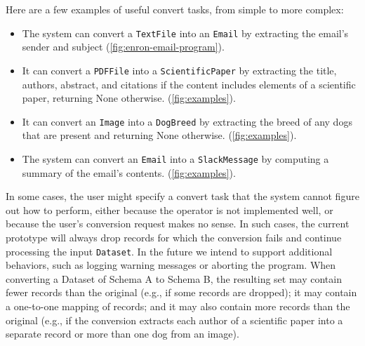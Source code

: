 Here are a few examples of useful convert tasks, from simple to more complex:
\begin{itemize}
  \item The system can convert a {\tt TextFile} into an {\tt Email} by extracting the email's sender and subject (\autoref{fig:enron-email-program}).%
  \item It can convert a {\tt PDFFile} into a {\tt ScientificPaper} by extracting the title, authors, abstract, and citations if the content includes elements of a scientific paper, returning None otherwise. (\autoref{fig:examples}).
  \item It can convert an {\tt Image} into a {\tt DogBreed} by extracting the breed of any dogs that are present and returning None otherwise. (\autoref{fig:examples}).
  \item The system can convert an {\tt Email} into a {\tt SlackMessage} by computing a summary of the email's contents. (\autoref{fig:examples}).
\end{itemize}


In some cases, the user might specify a convert task that the system cannot figure out how to perform, either because the operator is not implemented well, or because the user's conversion request makes no sense. In such cases, the current prototype will always drop records for which the conversion fails and continue processing the input {\tt Dataset}. In the future we intend to support additional behaviors, such as logging warning messages or aborting the program. When converting a Dataset of Schema A to Schema B, the resulting set may contain fewer records than the original (e.g., if some records are dropped); it may contain a one-to-one mapping of records; and it may also contain more records than the original (e.g., if the conversion extracts each author of a scientific paper into a separate record or more than one dog from an image).


